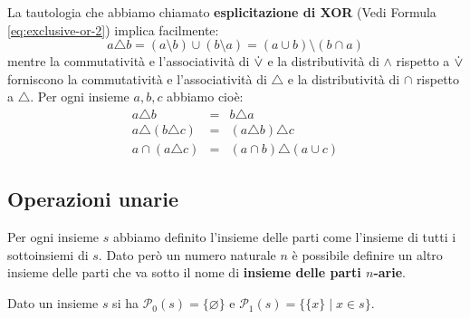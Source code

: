 La tautologia che abbiamo chiamato \textbf{esplicitazione di XOR} (Vedi Formula \ref{eq:exclusive-or-2}) implica facilmente:
\begin{equation}
	a \triangle b = (a \setminus b) \cup (b \setminus a) = (a \cup b) \setminus (b \cap a)
\end{equation}
mentre la commutatività e l'associatività di ${\displaystyle{\dot{\vee}}}$ e la distributività di $\land$ rispetto a ${\displaystyle{\dot{\vee}}}$ forniscono la commutatività e l'associatività di $\triangle$ e la distributività di $\cap$ rispetto a $\triangle$. Per ogni insieme $a,b,c$ abbiamo cioè:
\begin{eqnarray}
	a \triangle b &=& b \triangle a \\
	a \triangle(b \triangle c) &=& (a \triangle b) \triangle c \\
	a \cap ( a \triangle c) &=& (a \cap b) \triangle (a \cup c)
\end{eqnarray}
\begin{center}
	\def\firstcircle{(0,0) circle (1.5cm)}
	\def\secondcircle{(0:2cm) circle (1.5cm)}
	\setlength{\parskip}{5mm}
\end{center}
\subsection{Operazioni unarie}
Per ogni insieme $s$ abbiamo definito l'insieme delle parti come l'insieme di tutti i sottoinsiemi di $s$. Dato però un numero naturale $n$ è possibile definire un altro insieme delle parti che va sotto il nome di \textbf{insieme delle parti $n$-arie}.


\begin{example}
	Dato un insieme $s$ si ha $\mathcal{P}_{0}(s)= \{ \varnothing \} $ e $\mathcal{P}_{1}(s)= \bigl\{ \{x\} \; | \; x \in s \bigr\}$.
\end{example}

